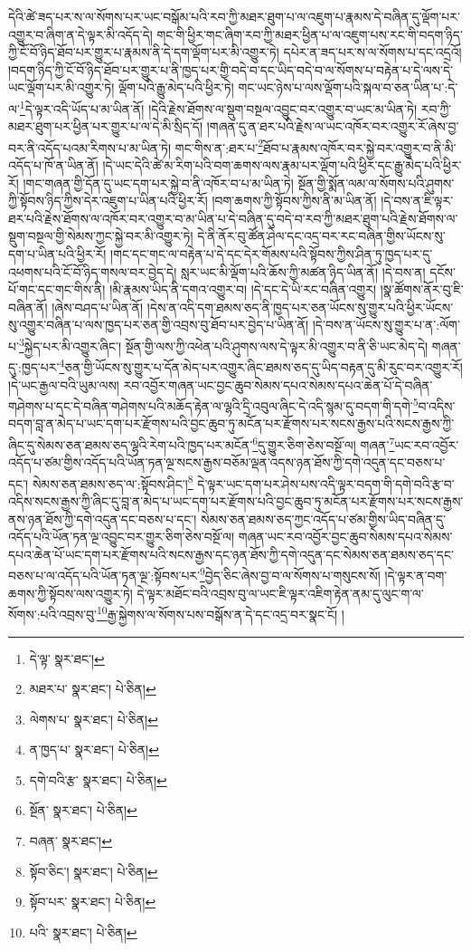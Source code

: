 དེའི་ཚེ་ཟད་པར་ས་ལ་སོགས་པར་ཡང་བསྒོམ་པའི་རབ་ཀྱི་མཐར་ཐུག་པ་ལ་འཇུག་པ་རྣམས་དེ་བཞིན་དུ་ལྡོག་པར་འགྱུར་བ་ཞིག་ན་དེ་ལྟར་མི་འདོད་དེ། གང་གི་ཕྱིར་གང་ཞིག་རབ་ཀྱི་མཐར་ཕྱིན་པ་ལ་འཇུག་པས་རང་གི་བདག་ཉིད་ཀྱི་ངོ་བོ་ཉིད་ཐོབ་པར་གྱུར་པ་རྣམས་ནི་དེ་དག་ལྡོག་པར་མི་འགྱུར་ཏེ། དཔེར་ན་ཟད་པར་ས་ལ་སོགས་པ་དང་འདྲའོ། །བདག་ཉིད་ཀྱི་ངོ་བོ་ཉིད་ཐོབ་པར་གྱུར་པ་ནི་ཁྱད་པར་གྱི་བདེ་བ་དང་ཡིད་བདེ་བ་ལ་སོགས་པ་བརྟེན་པ་དེ་ལས་དེ་ཡང་ལྡོག་པར་མི་འགྱུར་ཏེ། ལྡོག་པའི་རྒྱུ་མེད་པའི་ཕྱིར་ཏེ། གང་ཡང་ཉེས་པ་ལས་ལྡོག་པའི་སྐལ་བ་ཅན་ཡིན་པ་:དེ་ལ་\footnote{དེ་ལྟ་  སྣར་ཐང་། }དེ་ལྟར་འདི་ཡོད་པ་མ་ཡིན་ནོ། །དེའི་རྗེས་ཐོགས་ལ་སྡུག་བསྔལ་འབྱུང་བར་འགྱུར་བ་ཡང་མ་ཡིན་ཏེ། རབ་ཀྱི་མཐར་ཐུག་པར་ཕྱིན་པར་གྱུར་པ་ལ་དེ་མི་སྲིད་དོ། །གཞན་དུ་ན་ཐར་པའི་རྗེས་ལ་ཡང་འཁོར་བར་འགྱུར་རོ་ཞེས་བྱ་བར་ནི་འདོད་པའམ་རིགས་པ་མ་ཡིན་ཏེ། གང་གིས་ན་:ཐར་པ་\footnote{མཐར་པ་  སྣར་ཐང་།  པེ་ཅིན། }ཐོབ་པ་རྣམས་འཁོར་བར་སྐྱེ་བར་འགྱུར་བ་ནི་མི་འདོད་པ་ཁོ་ན་ཡིན་ནོ། །དེ་ཡང་དེའི་ཚེ་མ་རིག་པའི་བག་ཆགས་ལས་རྣམ་པར་ལྡོག་པའི་ཕྱིར་དང་རྒྱུ་མེད་པའི་ཕྱིར་རོ། །གང་གཞན་གྱི་དོན་དུ་ཡང་དག་པར་སྐྱེ་བ་ནི་འཁོར་བ་པ་མ་ཡིན་ཏེ། སྔོན་གྱི་སྨོན་ལམ་ལ་སོགས་པའི་ཤུགས་ཀྱི་སྟོབས་ཉིད་ཀྱིས་དེར་འཇུག་པ་ཡིན་པའི་ཕྱིར་རོ། །བག་ཆགས་ཀྱི་སྟོབས་ཀྱིས་ནི་མ་ཡིན་ནོ། །དེ་བས་ན་ཇི་ལྟར་ཐར་པའི་རྗེས་ཐོགས་ལ་འཁོར་བར་འགྱུར་བ་མ་ཡིན་པ་དེ་བཞིན་དུ་བདེ་བ་རབ་ཀྱི་མཐར་ཐུག་པའི་རྗེས་ཐོགས་ལ་སྡུག་བསྔལ་གྱི་སེམས་ཀྱང་སྐྱེ་བར་མི་འགྱུར་ཏེ། དེ་ནི་ནོར་བུ་ཚོན་ཤེལ་དང་འདྲ་བར་རང་བཞིན་གྱིས་ཡོངས་སུ་དག་པ་ཡིན་པའི་ཕྱིར་རོ། །གང་དང་གང་ལ་བརྟེན་པ་དེ་དང་དེར་གོམས་པའི་སྟོབས་ཀྱིས་ཤིན་ཏུ་ཁྱད་པར་དུ་འཕགས་པའི་ངོ་བོ་ཉིད་གསལ་བར་བྱེད་དེ། སླར་ཡང་མི་ལྡོག་པའི་ཆོས་ཀྱི་མཚན་ཉིད་ཡིན་ནོ། །དེ་བས་ན། དངོས་པོ་གང་དང་གང་གིས་ནི། །མི་རྣམས་ཡིད་ནི་དགའ་འགྱུར་བ། །དེ་དང་དེ་ཡི་རང་བཞིན་འགྱུར། །སྣ་ཚོགས་ནོར་བུ་ཇི་བཞིན་ནོ། །ཞེས་བཤད་པ་ཡིན་ནོ། །དེས་ན་འདི་དག་ཐམས་ཅད་ནི་ཁྱད་པར་ཅན་ཡོངས་སུ་གྱུར་པའི་ཕྱིར་ཡོངས་སུ་འགྱུར་བཞིན་པ་ལས་ཁྱད་པར་ཅན་གྱི་འབྲས་བུ་ཐོབ་པར་བྱེད་པ་ཡིན་ནོ། །དེ་བས་ན་ཡོངས་སུ་གྱུར་པ་ན་:ལོག་པ་\footnote{ལེགས་པ་  སྣར་ཐང་།  པེ་ཅིན། }སྐྱེད་པར་མི་འགྱུར་ཞིང་། སྔོན་གྱི་ལས་ཀྱི་འཕེན་པའི་ཤུགས་ལས་དེ་ལྟར་མི་འགྱུར་བ་ནི་ཅི་ཡང་མེད་དེ། གཞན་དུ་:ཁྱད་པར་\footnote{ན་ཁྱད་པ་  སྣར་ཐང་།  པེ་ཅིན། }ཅན་གྱི་ཡོངས་སུ་གྱུར་པ་དོན་མེད་པར་འགྱུར་ཞིང་ཐམས་ཅད་དུ་ཡིད་བརྟན་དུ་མི་རུང་བར་འགྱུར་རོ། །དེ་ཡང་རྒྱལ་བའི་ཡུམ་ལས། རབ་འབྱོར་གཞན་ཡང་བྱང་ཆུབ་སེམས་དཔའ་སེམས་དཔའ་ཆེན་པོ་དེ་བཞིན་གཤེགས་པ་དང་དེ་བཞིན་གཤེགས་པའི་མཆོད་རྟེན་ལ་ལྷའི་དྲི་འབུལ་ཞིང་དེ་འདི་སྙམ་དུ་བདག་གི་དགེ་\footnote{དགེ་བའི་རྩ་  སྣར་ཐང་།  པེ་ཅིན། }བ་འདིས་བདག་བླ་ན་མེད་པ་ཡང་དག་པར་རྫོགས་པའི་བྱང་ཆུབ་ཏུ་མངོན་པར་རྫོགས་པར་སངས་རྒྱས་པའི་སངས་རྒྱས་ཀྱི་ཞིང་དུ་སེམས་ཅན་ཐམས་ཅད་ལྷའི་རེག་པའི་ཁྱད་པར་མངོན་\footnote{སྔོན་  སྣར་ཐང་།  པེ་ཅིན། }དུ་གྱུར་ཅིག་ཅེས་བསྔོ་ལ། གཞན་\footnote{བཞན་  སྣར་ཐང་། }ཡང་རབ་འབྱོར་འདོད་པ་ཙམ་གྱིས་འདོད་པའི་ཡོན་ཏན་ལྔ་སངས་རྒྱས་བཅོམ་ལྡན་འདས་ཉན་ཐོས་ཀྱི་དགེ་འདུན་དང་བཅས་པ་དང་། སེམས་ཅན་ཐམས་ཅད་ལ་:སྟོབས་ཤིང་།\footnote{སྟོབ་ཅིང་།  སྣར་ཐང་།  པེ་ཅིན། } དེ་ལྟར་ཡང་དག་པར་ཤེས་པས་འདི་ལྟར་བདག་གི་དགེ་བའི་རྩ་བ་འདིས་སངས་རྒྱས་ཀྱི་ཞིང་དུ་བླ་ན་མེད་པ་ཡང་དག་པར་རྫོགས་པའི་བྱང་ཆུབ་ཏུ་མངོན་པར་རྫོགས་པར་སངས་རྒྱས་ནས་ཉན་ཐོས་ཀྱི་དགེ་འདུན་དང་བཅས་པ་དང་། སེམས་ཅན་ཐམས་ཅད་ཀྱང་འདོད་པ་ཙམ་གྱིས་ཡིད་བཞིན་དུ་འདོད་པའི་ཡོན་ཏན་ལྔ་འབྱུང་བར་གྱུར་ཅིག་ཅེས་བསྔོ་ལ། གཞན་ཡང་རབ་འབྱོར་བྱང་ཆུབ་སེམས་དཔའ་སེམས་དཔའ་ཆེན་པོ་ཡང་དག་པར་རྫོགས་པའི་སངས་རྒྱས་དང་ཉན་ཐོས་ཀྱི་དགེ་འདུན་དང་སེམས་ཅན་ཐམས་ཅད་དང་བཅས་པ་ལ་འདོད་པའི་ཡོན་ཏན་ལྔ་:སྟོབས་པར་\footnote{སྟོབ་པར་  སྣར་ཐང་།  པེ་ཅིན། }བྱེད་ཅིང་ཞེས་བྱ་བ་ལ་སོགས་པ་གསུངས་སོ། །དེ་ལྟར་ན་བག་ཆགས་ཀྱི་སྟོབས་ལས་འགྱུར་ཏེ། དེ་ལྟར་མཐོང་བའི་འབྲས་བུ་ལ་ཡང་ཇི་ལྟར་འཇིག་རྟེན་ནམ་དུ་ལུང་ག་ལ་སོགས་:པའི་འབྲས་བུ་\footnote{པའི་  སྣར་ཐང་།  པེ་ཅིན། }རྒྱ་སྐྱེགས་ལ་སོགས་པས་བསྒོས་ན་དེ་དང་འདྲ་བར་སྣང་ངོ། །
